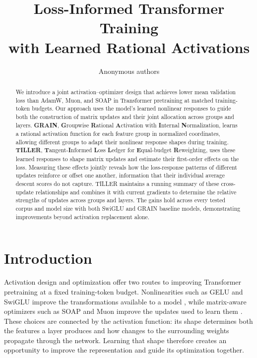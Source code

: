 \documentclass{article}
\title{Loss-Informed Transformer Training\\
with Learned Rational Activations}
\author{Anonymous authors}
\begin{document}
\maketitle

\begin{abstract}
We introduce a joint activation--optimizer design that achieves lower mean
validation loss than AdamW, Muon, and SOAP in Transformer pretraining at
matched training-token budgets. Our approach uses the model's learned
nonlinear responses to guide both the construction of matrix updates and
their joint allocation across groups and layers. \textbf{GRAIN},
\textbf{G}roupwise \textbf{R}ational \textbf{A}ctivation with \textbf{I}nternal
\textbf{N}ormalization, learns a rational activation function for each
feature group in normalized coordinates, allowing different groups to
adapt their nonlinear response shapes during training.
\textbf{TILLER}, \textbf{T}angent-\textbf{I}nformed \textbf{L}oss
\textbf{L}edger for \textbf{E}qual-budget \textbf{R}eweighting, uses these
learned responses to shape matrix updates and estimate their first-order effects on
the loss. Measuring these effects jointly reveals how the loss-response patterns of
different updates reinforce or offset one another, information that their
individual average descent scores do not capture. TILLER maintains a
running summary of these cross-update relationships and combines it with
current gradients to determine the relative strengths of updates across
groups and layers.
The gains hold across every tested corpus and model size with both SwiGLU
and GRAIN baseline models, demonstrating improvements beyond activation
replacement alone.
\end{abstract}

\section{Introduction}

Activation design and optimization offer two routes to improving
Transformer pretraining at a fixed training-token budget. Nonlinearities
such as GELU and SwiGLU improve the transformations available to a model
\citep{hendrycks2016gelu,shazeer2020glu}, while matrix-aware optimizers
such as SOAP and Muon improve the updates used to learn them
\citep{vyas2025soap,liu2025muon}. These choices are connected by the
activation function: its shape determines both the features a layer
produces and how changes to the surrounding weights propagate through
the network. Learning that shape therefore creates an opportunity to
improve the representation and guide its optimization together.
\end{document}
